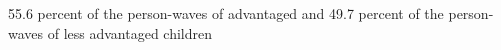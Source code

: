 55.6 percent of the person-waves of advantaged and 49.7 percent of the person-waves of less advantaged children%
